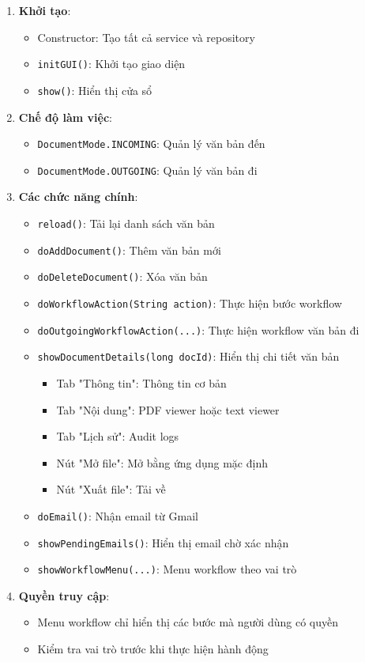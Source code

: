 \documentclass[12pt,a4paper]{article}
\begin{document}
\begin{enumerate}
    \item \textbf{Khởi tạo}:
    \begin{itemize}
        \item Constructor: Tạo tất cả service và repository
        \item \texttt{initGUI()}: Khởi tạo giao diện
        \item \texttt{show()}: Hiển thị cửa sổ
    \end{itemize}
    
    \item \textbf{Chế độ làm việc}:
    \begin{itemize}
        \item \texttt{DocumentMode.INCOMING}: Quản lý văn bản đến
        \item \texttt{DocumentMode.OUTGOING}: Quản lý văn bản đi
    \end{itemize}
    
    \item \textbf{Các chức năng chính}:
    \begin{itemize}
        \item \texttt{reload()}: Tải lại danh sách văn bản
        \item \texttt{doAddDocument()}: Thêm văn bản mới
        \item \texttt{doDeleteDocument()}: Xóa văn bản
        \item \texttt{doWorkflowAction(String action)}: Thực hiện bước workflow
        \item \texttt{doOutgoingWorkflowAction(...)}: Thực hiện workflow văn bản đi
        \item \texttt{showDocumentDetails(long docId)}: Hiển thị chi tiết văn bản
        \begin{itemize}
            \item Tab "Thông tin": Thông tin cơ bản
            \item Tab "Nội dung": PDF viewer hoặc text viewer
            \item Tab "Lịch sử": Audit logs
            \item Nút "Mở file": Mở bằng ứng dụng mặc định
            \item Nút "Xuất file": Tải về
        \end{itemize}
        \item \texttt{doEmail()}: Nhận email từ Gmail
        \item \texttt{showPendingEmails()}: Hiển thị email chờ xác nhận
        \item \texttt{showWorkflowMenu(...)}: Menu workflow theo vai trò
    \end{itemize}
    
    \item \textbf{Quyền truy cập}:
    \begin{itemize}
        \item Menu workflow chỉ hiển thị các bước mà người dùng có quyền
        \item Kiểm tra vai trò trước khi thực hiện hành động
    \end{itemize}
\end{enumerate}
\end{document}
